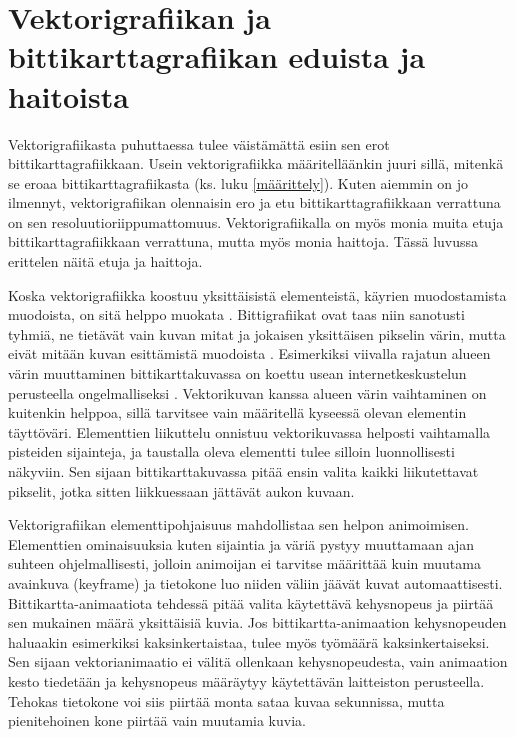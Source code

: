 \documentclass[utf8,bachelor]{gradu3}
\begin{document}
\section{Vektorigrafiikan ja bittikarttagrafiikan eduista ja haitoista}\label{vertailu}


Vektorigrafiikasta puhuttaessa tulee väistämättä esiin sen erot bittikarttagrafiikkaan. Usein vektorigrafiikka määritelläänkin juuri sillä, mitenkä se eroaa bittikarttagrafiikasta (ks. luku \ref{määrittely}). Kuten aiemmin on jo ilmennyt, vektorigrafiikan olennaisin ero ja etu bittikarttagrafiikkaan verrattuna on sen resoluutioriippumattomuus. Vektorigrafiikalla on myös monia muita etuja bittikarttagrafiikkaan verrattuna, mutta myös monia haittoja. Tässä luvussa erittelen näitä etuja ja haittoja.

Koska vektorigrafiikka koostuu yksittäisistä elementeistä, käyrien muodostamista muodoista, on sitä helppo muokata \parencite{RefWorks:doc:5bdc5224e4b05afcfde5b159}. Bittigrafiikat ovat taas niin sanotusti tyhmiä, ne tietävät vain kuvan mitat ja jokaisen yksittäisen pikselin värin, mutta eivät mitään kuvan esittämistä muodoista \parencite{RefWorks:doc:5bdc5292e4b05afcfde5b171}. Esimerkiksi viivalla rajatun alueen värin muuttaminen bittikarttakuvassa on koettu usean internetkeskustelun perusteella ongelmalliseksi \parencites{RefWorks:doc:5bdf1069e4b0a1f99c63c515}{RefWorks:doc:5bdf10ece4b0273295d72f8a}{RefWorks:doc:5bdf119fe4b0b329c55e47c9}. Vektorikuvan kanssa alueen värin vaihtaminen on kuitenkin helppoa, sillä tarvitsee vain määritellä kyseessä olevan elementin täyttöväri. Elementtien liikuttelu onnistuu vektorikuvassa helposti vaihtamalla pisteiden sijainteja, ja taustalla oleva elementti tulee silloin luonnollisesti näkyviin. Sen sijaan bittikarttakuvassa pitää ensin valita kaikki liikutettavat pikselit, jotka sitten liikkuessaan jättävät aukon kuvaan. \parencite{RefWorks:doc:5bdc5224e4b05afcfde5b159}

Vektorigrafiikan elementtipohjaisuus mahdollistaa sen helpon animoimisen. Elementtien ominaisuuksia kuten sijaintia ja väriä pystyy muuttamaan ajan suhteen ohjelmallisesti, jolloin animoijan ei tarvitse määrittää kuin muutama avainkuva (keyframe) ja tietokone luo niiden väliin jäävät kuvat automaattisesti. Bittikartta-animaatiota tehdessä pitää valita käytettävä kehysnopeus ja piirtää sen mukainen määrä yksittäisiä kuvia. \parencite{RefWorks:doc:5bdc5224e4b05afcfde5b159} Jos bittikartta-animaation kehysnopeuden haluaakin esimerkiksi kaksinkertaistaa, tulee myös työmäärä kaksinkertaiseksi. Sen sijaan vektorianimaatio ei välitä ollenkaan kehysnopeudesta, vain animaation kesto tiedetään ja kehysnopeus määräytyy käytettävän laitteiston perusteella. Tehokas tietokone voi siis piirtää monta sataa kuvaa sekunnissa, mutta pienitehoinen kone piirtää vain muutamia kuvia.
\end{document}
